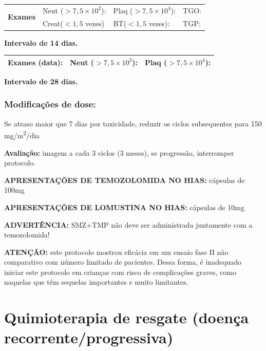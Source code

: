 \documentclass[11pt,a4paper,oldfontcommands]{memoir}
\begin{document}
\begin{center}
\begin{table}[H]
\begin{tabular}{p{1cm}p{5cm}|p{1cm}|p{4.5cm}|p{2cm}}
    \hline
    \multicolumn{1}{c|}{\multirow{2}{*}{\textbf{Exames}}}&\multicolumn{2}{l|}{Neut (\(>7,5\times10^2\)):}&{Plaq (\(>7,5\times10^4\)):}&{TGO:}\\
    \cline{2-5}
    \multicolumn{1}{c|}{\multirow{2}{*}{{}}}&\multicolumn{2}{l|}{Creat(\(<1,5\) vezes)}&{BT(\(<1,5\) vezes):}&{TGP:}
    \\
    \hline
\end{tabular}
\end{table}
\textbf{Intervalo de 14 dias.}
\begin{table}[H]
\begin{tabular}{p{5cm}|p{5cm}|p{4.7cm}}
    \hline
    \textbf{Exames (data):}&{Neut (\(>7,5\times10^2\)):}&{Plaq (\(>7,5\times10^4\)):}
    \\
    \hline
\end{tabular}
\end{table}
\textbf{Intervalo de 28 dias.}
\end{center}


\subsection{Modificações de dose:}
Se atraso maior que 7 dias por toxicidade, reduzir os ciclos subsequentes para 150 mg/m\textsuperscript{2}/dia

\textbf{Avaliação:} imagem a cada 3 ciclos (3 meses), se progressão, interromper protocolo.

\textbf{APRESENTAÇÕES DE TEMOZOLOMIDA NO HIAS:} cápsulas de 100mg

\textbf{APRESENTAÇÕES DE LOMUSTINA NO HIAS:} cápsulas de 10mg

\textbf{ADVERTÊNCIA:} SMZ+TMP não deve ser administrada juntamente com a temozolomida!

\textbf{ATENÇÃO:} este protocolo mostrou eficácia em um ensaio fase II não comparativo com número limitado de pacientes. Dessa forma, é inadequado iniciar este protocolo em crianças com risco de complicações graves, como naquelas que têm sequelas importantes e muito limitantes.

\cleardoublepage

\chapter{Quimioterapia de resgate (doença recorrente/progressiva)}

\cleardoublepage
\end{document}
